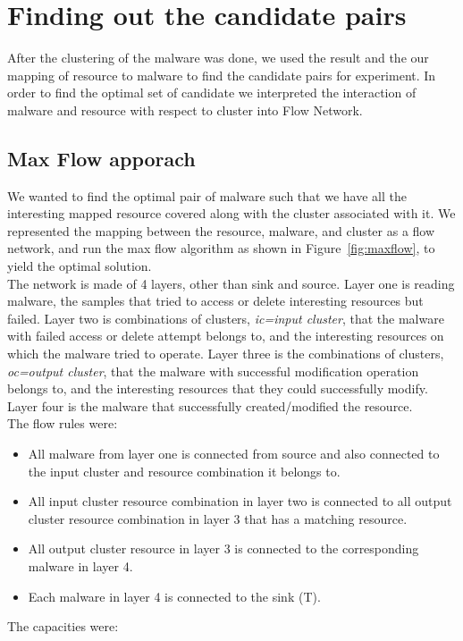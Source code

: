 \section{Finding out the candidate pairs}
\label{sec:Finding out the candidate pairs}
After the clustering of the malware was done, we used the result and the our mapping of resource to malware to find the candidate pairs for experiment.
In order to find the optimal set of candidate we interpreted the interaction of malware and resource with respect to cluster into Flow Network.
\subsection{Max Flow apporach}
\label{sub:Max Flow apporach}
We wanted to find the optimal pair of malware such that we have all the interesting mapped resource covered along with the cluster associated with it.
We represented the mapping between the resource, malware, and cluster as a flow network, and run the max flow algorithm as shown in Figure~\ref{fig:maxflow}, to yield the optimal solution.\\
The network is made of 4 layers, other than sink and source. Layer one is reading malware, the samples that tried to access or delete interesting resources but failed.
Layer two is combinations of clusters, \emph{ic=input cluster}, that the malware with failed access or delete attempt belongs to, and the interesting resources on which the malware tried to operate.
Layer three is the combinations of clusters, \emph{oc=output cluster}, that the malware with successful modification operation belongs to, and the interesting resources that they could successfully modify.
Layer four is the malware that successfully created/modified the resource.\\
The flow rules were:
\begin{itemize}
  \item All malware from layer one is connected from source and also connected to the input cluster and resource combination it belongs to.
  \item All input cluster resource combination in layer two is connected to all output cluster resource combination in layer 3 that has a matching resource.
  \item All output cluster resource in layer 3 is connected to the corresponding malware in layer 4.
  \item Each malware in layer 4 is connected to the sink (T).
\end{itemize}
The capacities were:
